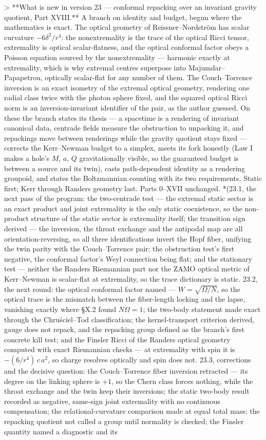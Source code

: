 > **What is new in version 23 — conformal repacking over an invariant gravity quotient, Part XVIII.** A branch on identity and budget, begun where the mathematics is exact. The optical geometry of Reissner–Nordström has scalar curvature $-6\delta^2/r^4$: the nonextremality is the trace of the optical Ricci tensor, extremality is optical scalar-flatness, and the optical conformal factor obeys a Poisson equation sourced by the nonextremality — harmonic exactly at extremality, which is why extremal centres superpose into Majumdar–Papapetrou, optically scalar-flat for any number of them. The Couch–Torrence inversion is an exact isometry of the extremal optical geometry, rendering one radial class twice with the photon sphere fixed, and the squared optical Ricci norm is an inversion-invariant identifier of the pair, as the author guessed. On these the branch states its thesis — a spacetime is a rendering of invariant canonical data, centrade fields measure the obstruction to unpacking it, and repackings move between renderings while the gravity quotient stays fixed — corrects the Kerr–Newman budget to a simplex, meets its fork honestly (Law I makes a hole's $M$, $a$, $Q$ gravitationally visible, so the guaranteed budget is between a source and its twin), casts path-dependent identity as a rendering groupoid, and states the Boltzmannian counting with its two requirements. Static first; Kerr through Randers geometry last. Parts 0–XVII unchanged. *(23.1, the next pass of the program: the two-centrade test — the extremal static sector is an exact product and joint extremality is the only static coexistence, so the non-product structure of the static sector is extremality itself; the transition sign derived — the inversion, the throat exchange and the antipodal map are all orientation-reversing, so all three identifications invert the Hopf fiber, unifying the twin parity with the Couch–Torrence pair; the obstruction test's first negative, the conformal factor's Weyl connection being flat; and the stationary test — neither the Randers Riemannian part nor the ZAMO optical metric of Kerr–Newman is scalar-flat at extremality, so the trace dictionary is static. 23.2, the next round: the optical conformal factor named — $W = \sqrt{\Omega/N}$, so the optical trace is the mismatch between the fiber-length locking and the lapse, vanishing exactly where §X.2 found $N\Omega = 1$; the two-body statement made exact through the Chruściel–Tod classification; the kernel-transport criterion derived, gauge does not repack, and the repacking group defined as the branch's first concrete kill test; and the Finsler Ricci of the Randers optical geometry computed with exact Riemannian checks — at extremality with spin it is $-(6/r^4)\,c\,a^2$, so charge resolves optically and spin does not. 23.3, corrections and the decisive question: the Couch–Torrence fiber inversion retracted — its degree on the linking sphere is $+1$, so the Chern class forces nothing, while the throat exchange and the twin keep their inversions; the static two-body result recorded as negative, same-sign joint extremality with no continuous compensation; the relational-curvature comparison made at equal total mass; the repacking quotient not called a group until normality is checked; the Finsler quantity named a diagnostic and its 
